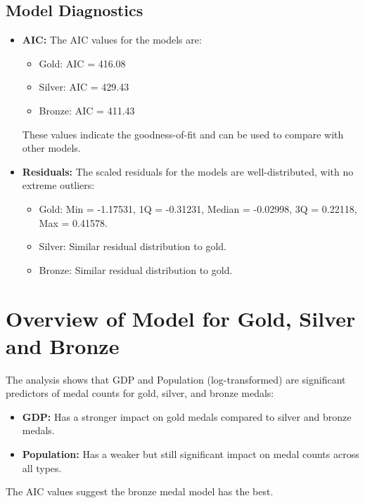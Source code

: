\documentclass[a4paper,12pt]{article}
\begin{document}
\subsection{Model Diagnostics}

\begin{itemize}
	\item \textbf{AIC:} The AIC values for the models are:
	\begin{itemize}
		\item Gold: AIC = 416.08
		\item Silver: AIC = 429.43
		\item Bronze: AIC = 411.43
	\end{itemize}
	These values indicate the goodness-of-fit and can be used to compare with other models.
	
	\item \textbf{Residuals:} The scaled residuals for the models are well-distributed, with no extreme outliers:
	\begin{itemize}
		\item Gold: Min = -1.17531, 1Q = -0.31231, Median = -0.02998, 3Q = 0.22118, Max = 0.41578.
		\item Silver: Similar residual distribution to gold.
		\item Bronze: Similar residual distribution to gold.
	\end{itemize}
\end{itemize}

\section{Overview of Model for Gold, Silver and Bronze }

The analysis shows that GDP and Population (log-transformed) are significant predictors of medal counts for gold, silver, and bronze medals:
\begin{itemize}
	\item \textbf{GDP:} Has a stronger impact on gold medals compared to silver and bronze medals.
	\item \textbf{Population:} Has a weaker but still significant impact on medal counts across all types.
\end{itemize}

The AIC values suggest the bronze medal model has the best.
\end{document}
